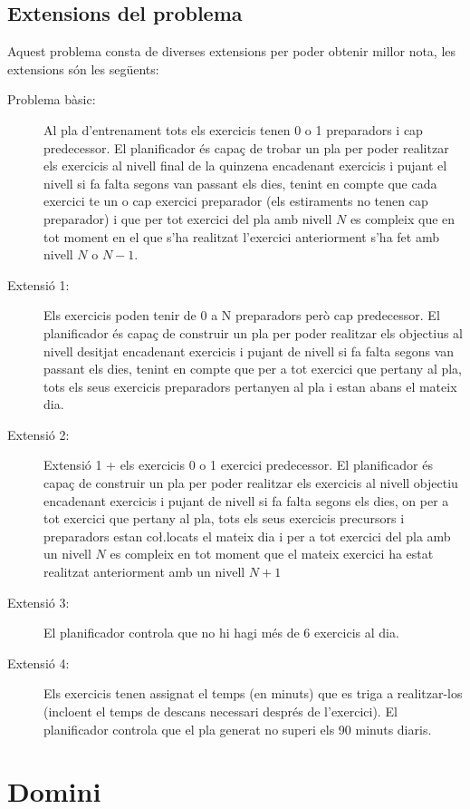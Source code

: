 \documentclass[a4paper,12pt, UTF-8]{article}
\begin{document}
\subsection{Extensions del problema}

Aquest problema consta de diverses extensions per poder obtenir millor nota, les extensions són les següents:

\begin{description}
	\item[Problema bàsic:] Al pla d'entrenament tots els exercicis tenen 0 o 1 preparadors i cap predecessor. El planificador és capaç de trobar un pla per poder realitzar els exercicis al nivell final de la quinzena encadenant exercicis i pujant el nivell si fa falta segons van passant els dies, tenint en compte que cada exercici te un o cap exercici preparador (els estiraments no tenen cap preparador) i que per tot exercici del pla amb nivell $N$ es compleix que en tot moment en el que s'ha realitzat l'exercici anteriorment s'ha fet amb nivell $N$ o $N - 1$.
	\item[Extensió 1:] Els exercicis poden tenir de 0 a N preparadors però cap predecessor. El planificador és capaç de construir un pla per poder realitzar els objectius al nivell desitjat encadenant exercicis i pujant de nivell si fa falta segons van passant els dies, tenint en compte que per a tot exercici que pertany al pla, tots els seus exercicis preparadors pertanyen al pla i estan abans el mateix dia.
	\item[Extensió 2:] Extensió 1 + 	els exercicis 0 o 1 exercici predecessor. El planificador és capaç de construir un pla per poder realitzar els exercicis al nivell objectiu encadenant exercicis i pujant de nivell si fa falta segons els dies, on per a tot exercici que pertany al pla, tots els seus exercicis precursors i preparadors estan co\l.locats el mateix dia i per a tot exercici del pla amb un nivell $N$ es compleix en tot moment que el mateix exercici ha estat realitzat anteriorment amb un nivell $N + 1$
	\item[Extensió 3:] El planificador controla que no hi hagi més de 6 exercicis al dia.
	\item[Extensió 4:] Els exercicis tenen assignat el temps (en minuts) que es triga a realitzar-los (incloent el temps de descans necessari després de l'exercici). El planificador controla que el pla generat no superi els 90 minuts diaris. 
\end{description}

\section{Domini}
\end{document}
